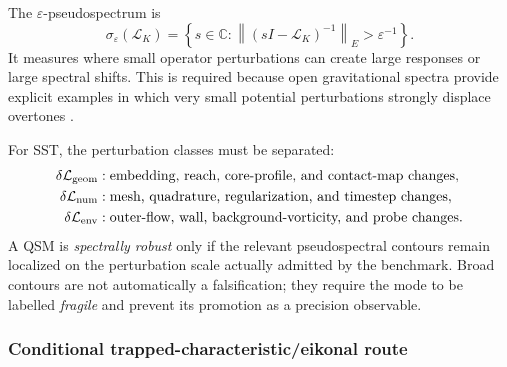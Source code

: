         The \(\varepsilon\)-pseudospectrum is
        \begin{equation}
            \boxed{
                \sigma_\varepsilon(\mathcal L_K)
                =
                \left\{
                    s\in\mathbb C:
                    \left\|
                        (sI-\mathcal L_K)^{-1}
                    \right\|_E
                    >
                    \varepsilon^{-1}
                \right\}
            }.
            \label{eq:rt_qss_pseudospectrum}
        \end{equation}
        It measures where small operator perturbations can create large responses or
        large spectral shifts.  This is required because open gravitational spectra
        provide explicit examples in which very small potential perturbations strongly
        displace overtones \cite{JaramilloPanossoMacedoAlSheikh2021,
        BertiEtAl2026BlackHoleSpectroscopy}.

        For SST, the perturbation classes must be separated:
        \begin{align}
            \delta\mathcal L_{\rm geom}
            &: \text{embedding, reach, core-profile, and contact-map changes},
            \\
            \delta\mathcal L_{\rm num}
            &: \text{mesh, quadrature, regularization, and timestep changes},
            \\
            \delta\mathcal L_{\rm env}
            &: \text{outer-flow, wall, background-vorticity, and probe changes}.
        \end{align}
        A QSM is \emph{spectrally robust} only if the relevant
        pseudospectral contours remain localized on the perturbation scale actually
        admitted by the benchmark.  Broad contours are not automatically a
        falsification; they require the mode to be labelled \emph{fragile} and prevent
        its promotion as a precision observable.

    \subsubsection*{Conditional trapped-characteristic/eikonal route}

